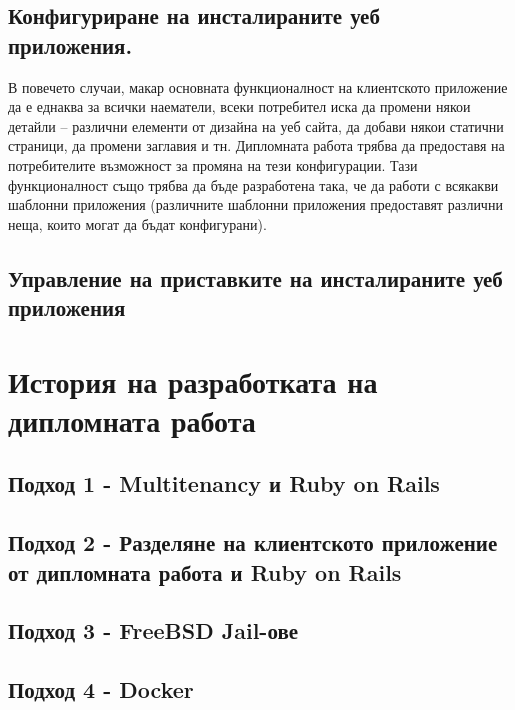 \documentclass[pdftex,14pt,a4paper]{extreport}
\begin{document}
\subsection {Конфигуриране на инсталираните уеб приложения.}
В повечето случаи, макар основната функционалност на клиентското приложение да е еднаква за всички наематели, всеки потребител иска да промени някои детайли – различни елементи от дизайна на уеб сайта, да добави някои статични страници, да промени заглавия и тн. Дипломната работа трябва да предоставя на потребителите възможност за промяна на тези конфигурации. Тази функционалност също трябва да бъде разработена така, че да работи с всякакви шаблонни приложения (различните шаблонни приложения предоставят различни неща, които могат да бъдат конфигурани).
\subsection {Управление на приставките на инсталираните уеб приложения}
\section {История на разработката на дипломната работа}
\subsection {Подход 1 - Multitenancy и Ruby on Rails}
\subsection {Подход 2 - Разделяне на клиентското приложение от дипломната работа и Ruby on Rails}
\subsection {Подход 3 - FreeBSD Jail-ове}
\subsection {Подход 4 - Docker}
%
%
\end{document}
